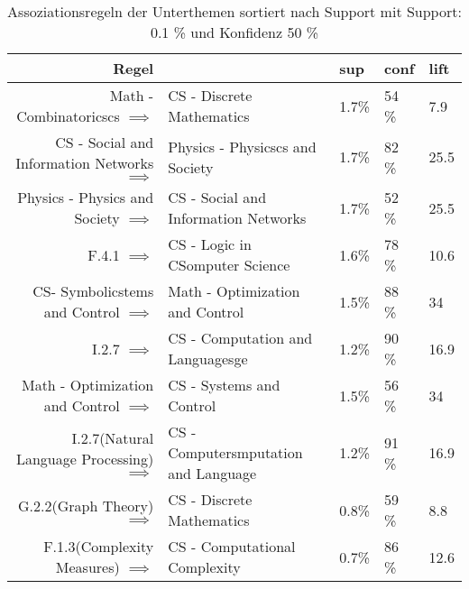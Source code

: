 \begin{table}[H]
\begin{tabular}{|rl|l|l|l|}
	\hline
	\textbf{Regel} & &\textbf{sup} &\textbf{conf} &\textbf{lift}\\
	\hline
	\small Math - Combinatoricscs $\implies$ & \small CS - Discrete Mathematics  &1.7\% &54 \% &7.9 \\
	\small CS - Social and Information Networks $\implies$ & \small Physics - Physicscs and Society &1.7\% &82 \% &25.5 \\
	\small Physics - Physics and Society $\implies$ & \small CS - Social and Information Networks &1.7\% &52 \% &25.5 \\
	\small F.4.1 $\implies$ & \small CS - Logic in CSomputer Science &1.6\% &78 \% &10.6 \\
	\small CS- Symbolicstems and Control $\implies$ & \small Math - Optimization and Control &1.5\% &88 \% &34 \\
	\small I.2.7 $\implies$ & \small CS - Computation and Languagesge &1.2\% &90 \% &16.9 \\
	\small Math - Optimization and Control $\implies$ & \small CS - Systems and Control  &1.5\% &56 \% &34 \\
	\small I.2.7(Natural Language Processing)  $\implies$ & \small CS - Computersmputation and Language  &1.2\% &91 \% &16.9 \\
	\small G.2.2(Graph Theory)   $\implies$ & \small CS - Discrete Mathematics  &0.8\% &59 \% &8.8 \\
	\small F.1.3(Complexity Measures)  $\implies$ & \small CS - Computational Complexity  &0.7\% &86 \% &12.6 \\
	\hline
\end{tabular}
 \caption{Assoziationsregeln der Unterthemen sortiert nach Support mit  Support: 0.1 \% und Konfidenz 50 \%}
\end{table}
